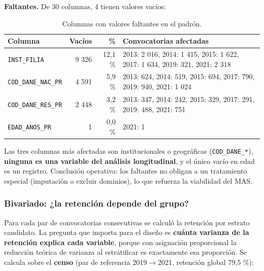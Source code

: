 \textbf{Faltantes.} De 30 columnas, 4 tienen valores vacíos:

\begin{table}[H]
  \centering
  \small
  \caption{Columnas con valores faltantes en el padrón.}
  \label{tab:mues-faltantes}
  \begin{tabular}{@{}lrrp{7.2cm}@{}}
    \toprule
    \textbf{Columna} & \textbf{Vacíos} & \textbf{\%} & \textbf{Convocatorias afectadas} \\
    \midrule
    \texttt{INST\_FILIA} & 9 326 & 12,1 \% & 2013: 2 016, 2014: 1 415,
        2015: 1 622, 2017: 1 634, 2019: 321, 2021: 2 318 \\
    \texttt{COD\_DANE\_NAC\_PR} & 4 591 & 5,9 \% & 2013: 624, 2014: 519,
        2015: 694, 2017: 790, 2019: 940, 2021: 1 024 \\
    \texttt{COD\_DANE\_RES\_PR} & 2 448 & 3,2 \% & 2013: 347, 2014: 242,
        2015: 329, 2017: 291, 2019: 488, 2021: 751 \\
    \texttt{EDAD\_ANOS\_PR} & 1 & 0,0 \% & 2021: 1 \\
    \bottomrule
  \end{tabular}
\end{table}

Las tres columnas más afectadas son institucionales o geográficas
(\texttt{COD\_DANE\_*}), \textbf{ninguna es una variable del análisis
longitudinal}, y el único vacío en edad es un registro. Conclusión operativa:
los faltantes no obligan a un tratamiento especial (imputación o excluir
dominios), lo que refuerza la viabilidad del MAS.

\subsubsection{Bivariado: ¿la retención depende del grupo?}

Para cada par de convocatorias consecutivas se calculó la retención por estrato
candidato. La pregunta que importa para el diseño es \textbf{cuánta varianza de
la retención explica cada variable}, porque con asignación proporcional la
reducción teórica de varianza al estratificar es exactamente esa proporción. Se
calcula sobre el \textbf{censo} (par de referencia 2019$\rightarrow$2021,
retención global 79,5 \%):

